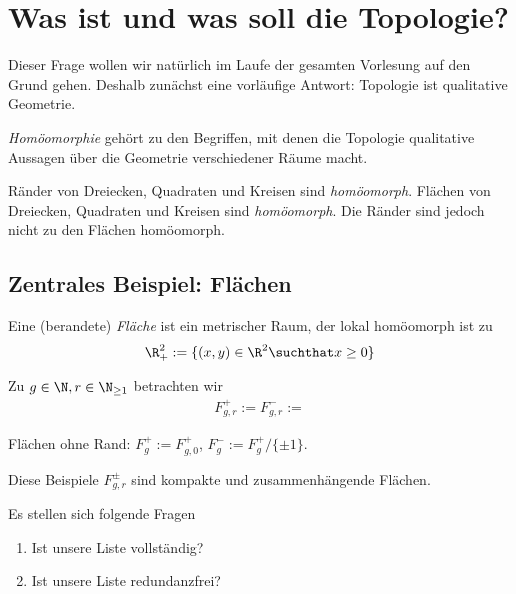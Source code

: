 \chapter{Was ist und was soll die Topologie?}


Dieser Frage wollen wir natürlich im Laufe der gesamten Vorlesung auf den Grund gehen.
Deshalb zunächst eine vorläufige Antwort: Topologie ist qualitative Geometrie.

\emph{Homöomorphie} gehört zu den Begriffen, mit denen die Topologie qualitative Aussagen über die Geometrie verschiedener Räume macht.

\begin{ex}
	Ränder von Dreiecken, Quadraten und Kreisen sind \emph{homöomorph}.
	Flächen von Dreiecken, Quadraten und Kreisen sind \emph{homöomorph}.
	Die Ränder sind jedoch nicht zu den Flächen homöomorph.
\end{ex}


\section{Zentrales Beispiel: Flächen}



\begin{df}
	Eine (berandete) \emph{Fläche} ist ein metrischer Raum, der lokal homöomorph ist zu
	\[
		\R^2_+ := \{ (x,y) \in \R^2 \suchthat x \ge 0 \}
	\]
\end{df}

\begin{ex}
	Zu $g \in \N, r \in \N_{\ge 1}$ betrachten wir
	\begin{align*}
		F_{g,r}^+ := %
		F_{g,r}^- := %
	\end{align*}

	Flächen ohne Rand: $F_g^+ := F_{g,0}^+$, $F_g^- := F_g^+ / \{\pm 1\}$.

	Diese Beispiele $F_{g,r}^{\pm}$ sind kompakte und zusammenhängende Flächen.

	Es stellen sich folgende Fragen
	\begin{enumerate}[1)]
		\item
			Ist unsere Liste vollständig?
		\item
			Ist unsere Liste redundanzfrei?
	\end{enumerate}
\end{ex}

